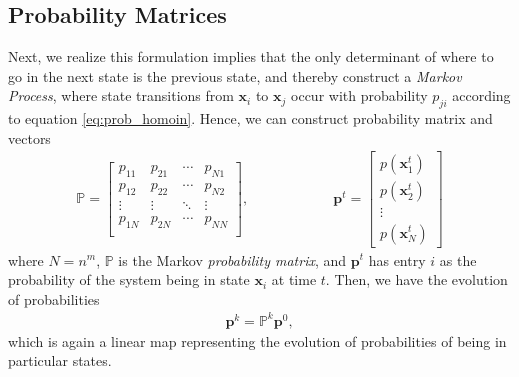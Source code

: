 \documentclass[superscriptaddress]{revtex4-1}
\begin{document}
\subsection{Probability Matrices}
Next, we realize this formulation implies that the only determinant of where to go in the next state is the previous state, and thereby construct a \emph{Markov Process}, where state transitions from $\bm{x}_i$ to $\bm{x}_j$ occur with probability $p_{ji}$ according to equation \ref{eq:prob_homoin}. Hence, we can construct probability matrix and vectors
\begin{align*}
\mathbb{P} = 
\begin{bmatrix}
p_{11} & p_{21} & \dotsm & p_{N1}\\
p_{12} & p_{22} & \dotsm & p_{N2}\\
\vdots & \vdots & \ddots & \vdots\\
p_{1N} & p_{2N} & \dotsm & p_{NN}\\
\end{bmatrix},
\hspace{1in}
\bm{p}^t =
\begin{bmatrix}
p(\bm{x}_1^t)\\
p(\bm{x}_2^t)\\
\vdots\\
p(\bm{x}_N^t)
\end{bmatrix}
\end{align*}
where $N = n^m$, $\mathbb{P}$ is the Markov \emph{probability matrix}, and $\bm{p}^t$ has entry $i$ as the probability of the system being in state $\bm{x}_i$ at time $t$. Then, we have the evolution of probabilities
\begin{align*}
\bm{p}^{k} = \mathbb{P}^k \bm{p}^0,
\end{align*}
which is again a linear map representing the evolution of probabilities of being in particular states.
\end{document}

